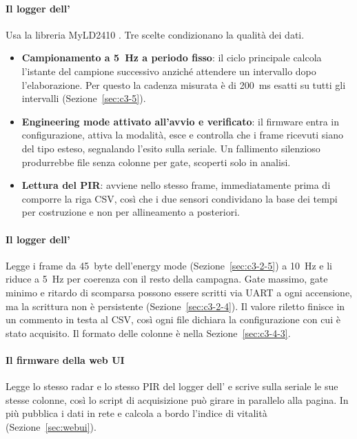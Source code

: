 \paragraph{Il logger dell'\ldb{}}

Usa la libreria MyLD2410 \cite{myld2410}. Tre scelte condizionano la qualità dei dati.

\begin{itemize}
  \item \textbf{Campionamento a 5~Hz a periodo fisso}: il ciclo principale calcola l'istante del campione successivo anziché attendere un intervallo dopo l'elaborazione. Per questo la cadenza misurata è di 200~ms esatti su tutti gli intervalli (Sezione~\ref{sec:c3-5}).
  \item \textbf{Engineering mode attivato all'avvio e verificato}: il firmware entra in configurazione, attiva la modalità, esce e controlla che i frame ricevuti siano del tipo esteso, segnalando l'esito sulla seriale. Un fallimento silenzioso produrrebbe file senza colonne per gate, scoperti solo in analisi.
  \item \textbf{Lettura del PIR}: avviene nello stesso frame, immediatamente prima di comporre la riga CSV, così che i due sensori condividano la base dei tempi per costruzione e non per allineamento a posteriori.
\end{itemize}

\paragraph{Il logger dell'\ldc{}}

Legge i frame da 45~byte dell'energy mode (Sezione~\ref{sec:c3-2-5}) a 10~Hz e li riduce a 5~Hz per coerenza con il resto della campagna. Gate massimo, gate minimo e ritardo di scomparsa possono essere scritti via UART a ogni accensione, ma la scrittura non è persistente (Sezione~\ref{sec:c3-2-4}). Il valore riletto finisce in un commento in testa al CSV, così ogni file dichiara la configurazione con cui è stato acquisito. Il formato delle colonne è nella Sezione~\ref{sec:c3-4-3}.

\paragraph{Il firmware della web UI}

Legge lo stesso radar e lo stesso PIR del logger dell'\ldb{} e scrive sulla seriale le sue stesse colonne, così lo script di acquisizione può girare in parallelo alla pagina. In più pubblica i dati in rete e calcola a bordo l'indice di vitalità (Sezione~\ref{sec:webui}).

